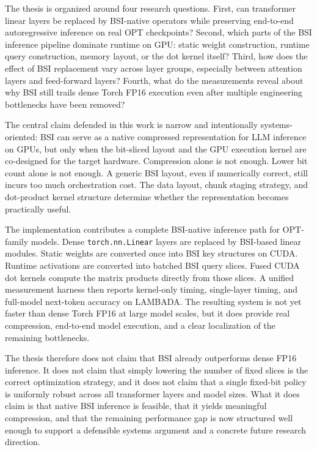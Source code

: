 The thesis is organized around four research questions. First, can transformer linear layers be replaced by BSI-native operators while preserving end-to-end autoregressive inference on real OPT checkpoints? Second, which parts of the BSI inference pipeline dominate runtime on GPU: static weight construction, runtime query construction, memory layout, or the dot kernel itself? Third, how does the effect of BSI replacement vary across layer groups, especially between attention layers and feed-forward layers? Fourth, what do the measurements reveal about why BSI still trails dense Torch FP16 execution even after multiple engineering bottlenecks have been removed?

The central claim defended in this work is narrow and intentionally systems-oriented: BSI can serve as a native compressed representation for LLM inference on GPUs, but only when the bit-sliced layout and the GPU execution kernel are co-designed for the target hardware. Compression alone is not enough. Lower bit count alone is not enough. A generic BSI layout, even if numerically correct, still incurs too much orchestration cost. The data layout, chunk staging strategy, and dot-product kernel structure determine whether the representation becomes practically useful.

The implementation contributes a complete BSI-native inference path for OPT-family models. Dense \texttt{torch.nn.Linear} layers are replaced by BSI-based linear modules. Static weights are converted once into BSI key structures on CUDA. Runtime activations are converted into batched BSI query slices. Fused CUDA dot kernels compute the matrix products directly from those slices. A unified measurement harness then reports kernel-only timing, single-layer timing, and full-model next-token accuracy on LAMBADA. The resulting system is not yet faster than dense Torch FP16 at large model scales, but it does provide real compression, end-to-end model execution, and a clear localization of the remaining bottlenecks.

The thesis therefore does not claim that BSI already outperforms dense FP16 inference. It does not claim that simply lowering the number of fixed slices is the correct optimization strategy, and it does not claim that a single fixed-bit policy is uniformly robust across all transformer layers and model sizes. What it does claim is that native BSI inference is feasible, that it yields meaningful compression, and that the remaining performance gap is now structured well enough to support a defensible systems argument and a concrete future research direction.

